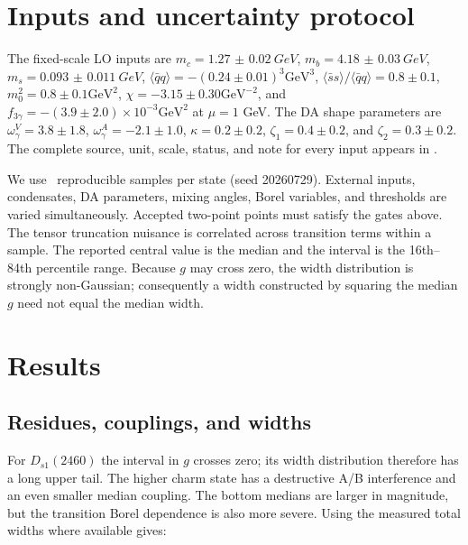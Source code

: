 \documentclass[11pt,a4paper]{article}
\newcommand{\GeV}{\mathrm{GeV}}
\begin{document}
\section{Inputs and uncertainty protocol}

The fixed-scale LO inputs are $m_c=\SI{1.27(2)}{GeV}$,
$m_b=\SI{4.18(3)}{GeV}$, $m_s=\SI{0.093(11)}{GeV}$,
$\langle\bar qq\rangle=-(0.24\pm0.01)^3\GeV^3$,
$\langle\bar ss\rangle/\langle\bar qq\rangle=0.8\pm0.1$,
$m_0^2=0.8\pm0.1\GeV^2$, $\chi=-3.15\pm0.30\GeV^{-2}$, and
$f_{3\gamma}=-(3.9\pm2.0)\times10^{-3}\GeV^2$ at $\mu=1$ GeV.  The DA shape
parameters are $\omega_\gamma^V=3.8\pm1.8$,
$\omega_\gamma^A=-2.1\pm1.0$, $\kappa=0.2\pm0.2$,
$\zeta_1=0.4\pm0.2$, and $\zeta_2=0.3\pm0.2$.  The complete source,
unit, scale, status, and note for every input appears in
.

We use \NMonteCarlo\ reproducible samples per state (seed 20260729).  External
inputs, condensates, DA parameters, mixing angles, Borel variables, and
thresholds are varied simultaneously.  Accepted two-point points must satisfy
the gates above.  The tensor truncation nuisance is correlated across
transition terms within a sample.  The reported central value is the median
and the interval is the 16th--84th percentile range.  Because $g$ may cross
zero, the width distribution is strongly non-Gaussian; consequently a width
constructed by squaring the median $g$ need not equal the median width.

\section{Results}

\subsection{Residues, couplings, and widths}

\begin{table}[H]
\centering\small
\resizebox{\textwidth}{!}{}
\caption{Monte Carlo medians and 16th--84th percentile intervals.  The sign
of $g$ follows \cref{eq:amplitude}; the width is sign independent.}
\label{tab:results}
\end{table}

For $D_{s1}(2460)$ the interval in $g$ crosses zero; its width distribution
therefore has a long upper tail.  The higher charm state has a destructive A/B
interference and an even smaller median coupling.  The bottom medians are
larger in magnitude, but the transition Borel dependence is also more severe.
Using the measured total widths where available gives:
\begin{table}[H]
\centering\small

\caption{Derived central branching fractions.  The $B_{s1}(5830)$ entry uses
the PDG central total width and is therefore especially uncertain.}
\end{table}
\end{document}
